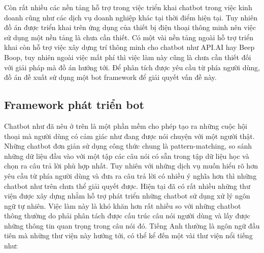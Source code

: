 \documentclass[12pt]{report}
\begin{document}
Còn rất nhiều các nền tảng hỗ trợ trong việc triển khai chatbot trong việc kinh doanh cũng như các dịch vụ doanh nghiệp khác tại thời điểm hiện tại. Tuy nhiên đồ án được triển khai trên ứng dụng của thiết bị điện thoại thông minh nên việc sử dụng một nền tảng là chưa cần thiết. Có một vài nền tảng ngoài hỗ trợ triển khai còn hỗ trợ việc xây dựng trí thông minh cho chatbot như API.AI hay Beep Boop, tuy nhiên ngoài việc mất phí thì việc làm này cũng là chưa cần thiết đối với giải pháp mà đồ án hướng tới. Để phân tích được yêu cầu từ phía người dùng, đồ án đề xuất sử dụng một bot framework để giải quyết vấn đề này.

\subsection{Framework phát triển bot}

Chatbot như đã nêu ở trên là một phần mềm cho phép tạo ra những cuộc hội thoại mà người dùng có cảm giác như đang được nói chuyện với một người thật. Những chatbot đơn giản sử dụng công thức chung là pattern-matching, so sánh những dữ liệu đầu vào với một tập các câu nói có sẵn trong tập dữ liệu học và chọn ra câu trả lời phù hợp nhất. Tuy nhiên với những dịch vụ muốn hiểu rõ hơn yêu cầu từ phía người dùng và đưa ra câu trả lời có nhiều ý nghĩa hơn thì những chatbot như trên chưa thể giải quyết được. Hiện tại đã có rất nhiều những thư viện được xây dựng nhằm hỗ trợ phát triển những chatbot sử dụng xử lý ngôn ngữ tự nhiên. Việc làm này là khó khăn hơn rất nhiều so với những chatbot thông thường do phải phân tách được cấu trúc câu nói người dùng và lấy được những thông tin quan trọng trong câu nói đó. Tiếng Anh thường là ngôn ngữ đầu tiên mà những thư viện này hướng tới, có thể kể đến một vài thư viện nổi tiếng như:
\end{document}
